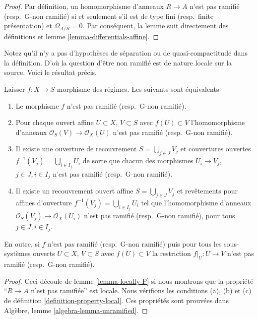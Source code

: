 \begin{proof}
Par définition, un homomorphisme d'anneaux $R \to A$ n'est pas ramifié (resp.\ G-non ramifié) si et seulement s'il est de type fini (resp.\ finite présentation) et $\Omega_{A/R} = 0$. Par conséquent, la lemme suit directement des définitions et lemme \ref{lemma-differentials-affine}.
\end{proof}

\noindent
Notez qu'il n'y a pas d'hypothèses de séparation ou de quasi-compactitude dans la définition. D'où la question d'être non ramifié est de nature locale sur la source. Voici le résultat précis.

\begin{lemma}

\label{lemma-unramified-characterize}

Laisser $f : X \to S$ morphisme des régimes. Les suivants sont équivalents

\begin{enumerate}

\item Le morphisme $f$ n'est pas ramifié (resp.\ G-non ramifié).
\item Pour chaque ouvert affine $U \subset X$, $V \subset S$
avec $f(U) \subset V$ l'homomorphisme d'anneaux
$\mathcal{O}_S(V) \to \mathcal{O}_X(U)$ n'est pas ramifié (resp.\ G-non ramifié).
\item Il existe une ouverture de recouvrement $S = \bigcup_{j \in J} V_j$
et couvertures ouvertes $f^{-1}(V_j) = \bigcup_{i \in I_j} U_i$ de sorte que chacun des morphismes $U_i \to V_j$, $j\in J, i\in I_j$
n'est pas ramifié (resp.\ G-non ramifié).
\item Il existe un recouvrement ouvert affine $S = \bigcup_{j \in J} V_j$
et revêtements pour affines d'ouverture $f^{-1}(V_j) = \bigcup_{i \in I_j} U_i$ tel que l'homomorphisme d'anneaux $\mathcal{O}_S(V_j) \to \mathcal{O}_X(U_i)$ n'est pas ramifié (resp.\ G-non ramifié), pour tous $j\in J, i\in I_j$.

\end{enumerate}

En outre, si $f$ n'est pas ramifié (resp.\ G-non ramifié) puis pour tous les sous-systèmes ouverts $U \subset X$, $V \subset S$ avec $f(U) \subset V$
la restriction $f|_U : U \to V$ n'est pas ramifié (resp.\ G-non ramifié).

\end{lemma}

\begin{proof}
Ceci découle de lemme \ref{lemma-locally-P} si nous montrons que la propriété ``$R \to A$ n'est pas ramifiée'' est locale. Nous vérifions les conditions (a), (b) et (c) de définition \ref{definition-property-local}. Ces propriétés sont prouvées dans Algèbre, lemme \ref{algebra-lemma-unramified}.
\end{proof}

